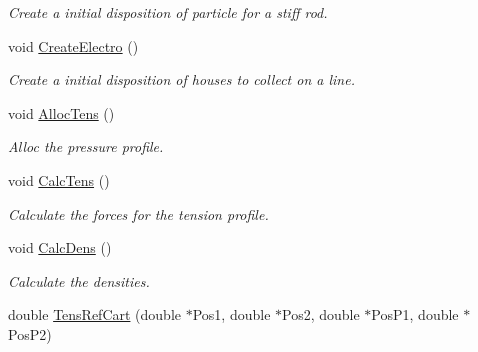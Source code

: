 \begin{DoxyCompactItemize}
\begin{DoxyCompactList}\small\item\em \-Create a initial disposition of particle for a stiff rod. \end{DoxyCompactList}\item 
\hypertarget{classForces_a6ef0b763f3b80142cda476d73e2753a5}{void \hyperlink{classForces_a6ef0b763f3b80142cda476d73e2753a5}{\-Create\-Electro} ()}\label{classForces_a6ef0b763f3b80142cda476d73e2753a5}

\begin{DoxyCompactList}\small\item\em \-Create a initial disposition of houses to collect on a line. \end{DoxyCompactList}\item 
\hypertarget{classForces_ac6a2e2465107cd1b6eea81aeb80646c2}{void \hyperlink{classForces_ac6a2e2465107cd1b6eea81aeb80646c2}{\-Alloc\-Tens} ()}\label{classForces_ac6a2e2465107cd1b6eea81aeb80646c2}

\begin{DoxyCompactList}\small\item\em \-Alloc the pressure profile. \end{DoxyCompactList}\item 
\hypertarget{classForces_a69a4a0318fb6e0382d6e2288a40c9e98}{void \hyperlink{classForces_a69a4a0318fb6e0382d6e2288a40c9e98}{\-Calc\-Tens} ()}\label{classForces_a69a4a0318fb6e0382d6e2288a40c9e98}

\begin{DoxyCompactList}\small\item\em \-Calculate the forces for the tension profile. \end{DoxyCompactList}\item 
\hypertarget{classForces_a44c4bed1843e51f20f252a5dd05f64fe}{void \hyperlink{classForces_a44c4bed1843e51f20f252a5dd05f64fe}{\-Calc\-Dens} ()}\label{classForces_a44c4bed1843e51f20f252a5dd05f64fe}

\begin{DoxyCompactList}\small\item\em \-Calculate the densities. \end{DoxyCompactList}\item 
\hypertarget{classForces_afad21f344bdeced26172aaf70d26e844}{double \hyperlink{classForces_afad21f344bdeced26172aaf70d26e844}{\-Tens\-Ref\-Cart} (double $\ast$\-Pos1, double $\ast$\-Pos2, double $\ast$\-Pos\-P1, double $\ast$\-Pos\-P2)}\label{classForces_afad21f344bdeced26172aaf70d26e844}


\end{DoxyCompactItemize}
